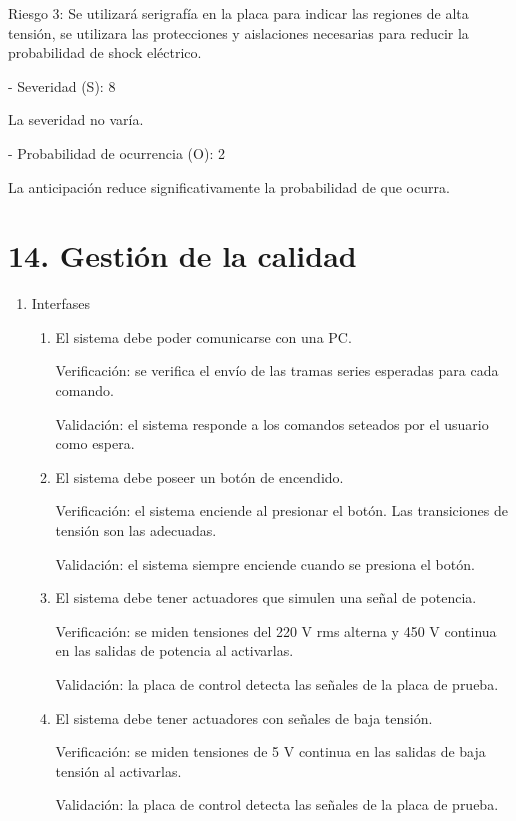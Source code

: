 \documentclass[
11pt, %
codirector, %
]{charter}
\begin{document}
Riesgo 3: Se utilizará serigrafía en la placa para indicar las regiones de alta tensión, se utilizara las protecciones y aislaciones necesarias para reducir la probabilidad de shock eléctrico.

- Severidad (S): 8

La severidad no varía.

- Probabilidad de ocurrencia (O): 2

La anticipación reduce significativamente la probabilidad de que ocurra.


\section{14. Gestión de la calidad}
\label{sec:calidad}

\begin{enumerate}
	\item Interfases
	      \begin{enumerate}
		      \item El sistema debe poder comunicarse con una PC.

		            Verificación: se verifica el envío de las tramas series esperadas para cada comando.

		            Validación: el sistema responde a los comandos seteados por el usuario como espera.
		      \item El sistema debe poseer un botón de encendido.

		            Verificación: el sistema enciende al presionar el botón. Las transiciones de tensión son las adecuadas.

		            Validación: el sistema siempre enciende cuando se presiona el botón.

		      \item El sistema debe tener actuadores que simulen una señal de potencia.

		            Verificación: se miden tensiones del 220 V rms alterna y 450 V continua en las salidas de potencia al activarlas.

		            Validación: la placa de control detecta las señales de la placa de prueba.
		      \item El sistema debe tener actuadores con señales de baja tensión.

		            Verificación: se miden tensiones de 5 V continua en las salidas de baja tensión al activarlas.

		            Validación: la placa de control detecta las señales de la placa de prueba.


\end{enumerate}
\end{enumerate}
\end{document}
